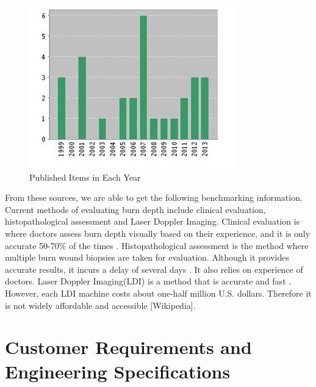 \documentclass[paper=letter, fontsize=11pt]{scrartcl}
\numberwithin{equation}{section}		%
\numberwithin{figure}{section}			%
\numberwithin{table}{section}			%
\begin{document}
\begin{figure}[H]
    \centering
    \includegraphics[scale=1]{PIEY}
	\caption{Published Items in Each Year}
\end{figure}

From these sources, we are able to get the following benchmarking information. Current methods of evaluating burn depth
include clinical evaluation, histopathological assessment and Laser Doppler Imaging. Clinical evaluation is where doctors
assess burn depth visually based on their experience, and it is only accurate 50-70\% of the times \cite{Renkielska}.
Histopathological assessment is the method where multiple burn wound biopsies are taken for evaluation. Although it provides
accurate results, it incurs a delay of several days \cite{Renkielska}. It also relies on experience of doctors. Laser Doppler Imaging(LDI) 
is a method that is accurate and fast \cite{Pape}. However, each LDI machine costs about one-half million U.S. dollars.
Therefore it is not widely affordable and accessible [Wikipedia].


\section{Customer Requirements and Engineering Specifications}
\end{document}
